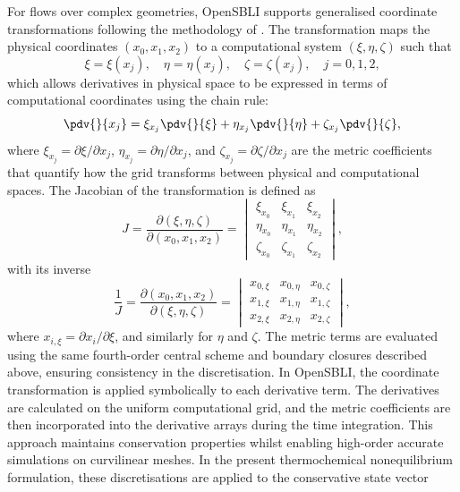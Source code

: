 For flows over complex geometries, OpenSBLI supports generalised coordinate transformations following the methodology of \cite{ZhangZhang2022}. The transformation maps the physical coordinates $(x_0, x_1, x_2)$ to a computational system $(\xi, \eta, \zeta)$ such that
\begin{equation}
    \xi = \xi(x_j), \quad \eta = \eta(x_j), \quad \zeta = \zeta(x_j), \quad j = 0, 1, 2,
\end{equation}
which allows derivatives in physical space to be expressed in terms of computational coordinates using the chain rule:
\begin{equation}
    \pdv{}{x_j} = \xi_{x_j} \pdv{}{\xi} + \eta_{x_j} \pdv{}{\eta} + \zeta_{x_j} \pdv{}{\zeta},
\end{equation}
where $\xi_{x_j} = \partial\xi/\partial x_j$, $\eta_{x_j} = \partial\eta/\partial x_j$, and $\zeta_{x_j} = \partial\zeta/\partial x_j$ are the metric coefficients that quantify how the grid transforms between physical and computational spaces. The Jacobian of the transformation is defined as
\begin{equation}
    J = \frac{\partial(\xi, \eta, \zeta)}{\partial(x_0, x_1, x_2)} = 
    \begin{vmatrix}
        \xi_{x_0} & \xi_{x_1} & \xi_{x_2} \\
        \eta_{x_0} & \eta_{x_1} & \eta_{x_2} \\
        \zeta_{x_0} & \zeta_{x_1} & \zeta_{x_2}
    \end{vmatrix},
\end{equation}
with its inverse
\begin{equation}
    \frac{1}{J} = \frac{\partial(x_0, x_1, x_2)}{\partial(\xi, \eta, \zeta)} = 
    \begin{vmatrix}
        x_{0,\xi} & x_{0,\eta} & x_{0,\zeta} \\
        x_{1,\xi} & x_{1,\eta} & x_{1,\zeta} \\
        x_{2,\xi} & x_{2,\eta} & x_{2,\zeta}
    \end{vmatrix},
\end{equation}
where $x_{i,\xi} = \partial x_i/\partial\xi$, and similarly for $\eta$ and $\zeta$. The metric terms are evaluated using the same fourth-order central scheme and boundary closures described above, ensuring consistency in the discretisation. In OpenSBLI, the coordinate transformation is applied symbolically to each derivative term. The derivatives are calculated on the uniform computational grid, and the metric coefficients are then incorporated into the derivative arrays during the time integration. This approach maintains conservation properties whilst enabling high-order accurate simulations on curvilinear meshes. In the present thermochemical nonequilibrium formulation, these discretisations are applied to the conservative state vector
